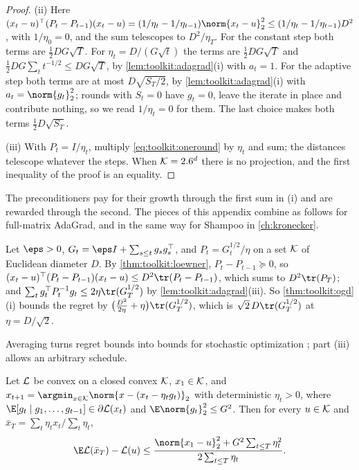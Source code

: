 \begin{refsection}
\begin{proof}
(ii) Here $(x_t-u)^\top(P_t-P_{t-1})(x_t-u)=(1/\eta_t-1/\eta_{t-1})\norm{x_t-u}_2^2\le(1/\eta_t-1/\eta_{t-1})D^2$, with $1/\eta_0=0$, and the sum telescopes to $D^2/\eta_T$. For the constant step both terms are $\frac12DG\sqrt T$. For $\eta_t=D/(G\sqrt t)$ the terms are $\frac12DG\sqrt T$ and $\frac12DG\sum_tt^{-1/2}\le DG\sqrt T$, by \cref{lem:toolkit:adagrad}(i) with $a_t=1$. For the adaptive step both terms are at most $D\sqrt{S_T/2}$, by \cref{lem:toolkit:adagrad}(i) with $a_t=\norm{g_t}_2^2$; rounds with $S_t=0$ have $g_t=0$, leave the iterate in place and contribute nothing, so we read $1/\eta_t=0$ for them. The last choice makes both terms $\frac12D\sqrt{S_T}$.

(iii) With $P_t=I/\eta_t$, multiply \eqref{eq:toolkit:oneround} by $\eta_t$ and sum; the distances telescope whatever the steps. When $\mathcal{K}=2.6^d$ there is no projection, and the first inequality of the proof is an equality.
\end{proof}

The preconditioners pay for their growth through the first sum in (i) and are rewarded through the second. The pieces of this appendix combine as follows for full-matrix AdaGrad, and in the same way for Shampoo in \cref{ch:kronecker}.

\begin{remark}\label{rem:toolkit:fullmatrix}
Let $\eps>0$, $G_t=\eps I+\sum_{s\le t}g_sg_s^\top$, and $P_t=G_t^{1/2}/\eta$ on a set $\mathcal{K}$ of Euclidean diameter $D$. By \cref{thm:toolkit:loewner}, $P_t-P_{t-1}\succeq0$, so $(x_t-u)^\top(P_t-P_{t-1})(x_t-u)\le D^2\tr(P_t-P_{t-1})$, which sums to $D^2\tr(P_T)$; and $\sum_tg_t^\top P_t^{-1}g_t\le2\eta\tr(G_T^{1/2})$ by \cref{lem:toolkit:adagrad}(iii). So \cref{thm:toolkit:ogd}(i) bounds the regret by $\bigl(\frac{D^2}{2\eta}+\eta\bigr)\tr(G_T^{1/2})$, which is $\sqrt2\,D\tr(G_T^{1/2})$ at $\eta=D/\sqrt2$.
\end{remark}

Averaging turns regret bounds into bounds for stochastic optimization \parencite{CesaBianchiConconiGentile2004}; part (iii) allows an arbitrary schedule.

\begin{corollary}\label{cor:toolkit:sgd}
Let $\mathcal{L}$ be convex on a closed convex $\mathcal{K}$, $x_1\in\mathcal{K}$, and $x_{t+1}=\argmin_{x\in\cK}\norm{x-(x_t-\eta_tg_t)}_2$ with deterministic $\eta_t>0$, where $\E[g_t\mid g_1,\dots,g_{t-1}]\in\partial\Loss(x_t)$ and $\E\norm{g_t}_2^2\le G^2$. Then for every $u\in\mathcal{K}$ and $\bar x_T=\sum_t\eta_tx_t/\sum_t\eta_t$,
\[
  \E\Loss(\bar x_T)-\Loss(u)\le\frac{\norm{x_1-u}_2^2+G^2\sum_{t\le T}\eta_t^2}{2\sum_{t\le T}\eta_t}.
\]
\end{corollary}


\end{refsection}
